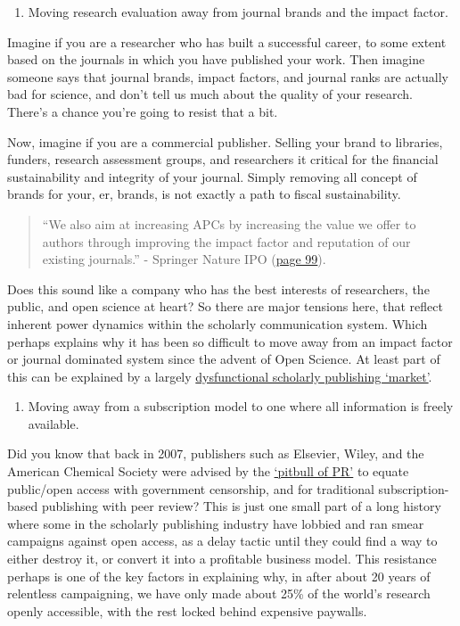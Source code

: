 \documentclass[]{book}
\providecommand{\tightlist}{%
  \setlength{\itemsep}{0pt}\setlength{\parskip}{0pt}}
\begin{document}
\begin{enumerate}
\def\labelenumi{\arabic{enumi}.}
\tightlist
\item
  Moving research evaluation away from journal brands and the impact factor.
\end{enumerate}

Imagine if you are a researcher who has built a successful career, to some extent based on the journals in which you have published your work. Then imagine someone says that journal brands, impact factors, and journal ranks are actually bad for science, and don't tell us much about the quality of your research. There's a chance you're going to resist that a bit.

Now, imagine if you are a commercial publisher. Selling your brand to libraries, funders, research assessment groups, and researchers it critical for the financial sustainability and integrity of your journal. Simply removing all concept of brands for your, er, brands, is not exactly a path to fiscal sustainability.

\begin{quote}
``We also aim at increasing APCs by increasing the value we offer to authors through improving the impact factor and reputation of our existing journals.'' - Springer Nature IPO (\href{http://web.archive.org/web/20180507134223/http:/proxy.dbagproject.de/mediacenter/ressourcen/pdf/emissionen/springernature_prospectus.pdf}{page 99}).
\end{quote}

Does this sound like a company who has the best interests of researchers, the public, and open science at heart? So there are major tensions here, that reflect inherent power dynamics within the scholarly communication system. Which perhaps explains why it has been so difficult to move away from an impact factor or journal dominated system since the advent of Open Science. At least part of this can be explained by a largely \href{https://zenodo.org/record/1472045\#.W-7r8ZP7RPY}{dysfunctional scholarly publishing `market'}.

\begin{enumerate}
\def\labelenumi{\arabic{enumi}.}
\setcounter{enumi}{1}
\tightlist
\item
  Moving away from a subscription model to one where all information is freely available.
\end{enumerate}

Did you know that back in 2007, publishers such as Elsevier, Wiley, and the American Chemical Society were advised by the \href{https://www.nature.com/articles/445347a}{`pitbull of PR'} to equate public/open access with government censorship, and for traditional subscription-based publishing with peer review? This is just one small part of a long history where some in the scholarly publishing industry have lobbied and ran smear campaigns against open access, as a delay tactic until they could find a way to either destroy it, or convert it into a profitable business model. This resistance perhaps is one of the key factors in explaining why, in after about 20 years of relentless campaigning, we have only made about 25\% of the world's research openly accessible, with the rest locked behind expensive paywalls.
\end{document}
